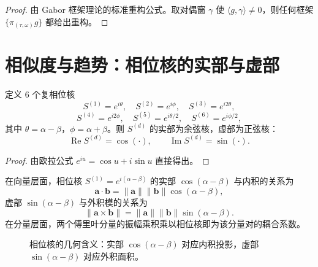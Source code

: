 \begin{proof}
由 Gabor 框架理论的标准重构公式。取对偶窗 $\gamma$ 使 $\langle g,\gamma\rangle\ne 0$，则任何框架 $\{\pi_{(\tau,\omega)}g\}$ 都给出重构。
\end{proof}

\section{\texorpdfstring{相似度与趋势：相位核的实部与虚部}{相似度与趋势}}

\begin{proposition}[6 个复相位核及其实部与虚部]\label{prop:twelve_to_six}
定义 6 个复相位核
\[
S^{(1)} = e^{i\theta}, \quad S^{(2)} = e^{i\phi}, \quad S^{(3)} = e^{i2\theta},
\]
\[
S^{(4)} = e^{i2\phi}, \quad S^{(5)} = e^{i\theta/2}, \quad S^{(6)} = e^{i\phi/2},
\]
其中 $\theta = \alpha - \beta$，$\phi = \alpha + \beta$。则 $S^{(d)}$ 的实部为余弦核，虚部为正弦核：
\[
\operatorname{Re} S^{(d)} = \cos(\cdot), \qquad \operatorname{Im} S^{(d)} = \sin(\cdot).
\]
\end{proposition}

\begin{proof}
由欧拉公式 $e^{iu} = \cos u + i\sin u$ 直接得出。
\end{proof}

\begin{remark}\label{rem:phase_kernel_inner_outer}
在向量层面，相位核 $S^{(1)} = e^{i(\alpha-\beta)}$ 的实部 $\cos(\alpha-\beta)$ 与内积的关系为
\[
\mathbf{a} \cdot \mathbf{b} = \|\mathbf{a}\| \|\mathbf{b}\| \cos(\alpha - \beta),
\]
虚部 $\sin(\alpha-\beta)$ 与外积模的关系为
\[
\|\mathbf{a} \times \mathbf{b}\| = \|\mathbf{a}\| \|\mathbf{b}\| \sin(\alpha - \beta).
\]
在分量层面，两个傅里叶分量的振幅乘积乘以相位核即为该分量对的耦合系数。
\end{remark}

\begin{figure}[htbp]
\centering
{}
\caption{相位核的几何含义：实部 $\cos(\alpha-\beta)$ 对应内积投影，虚部 $\sin(\alpha-\beta)$ 对应外积面积。}
\label{fig:phase_kernel_geometry}
\end{figure}

